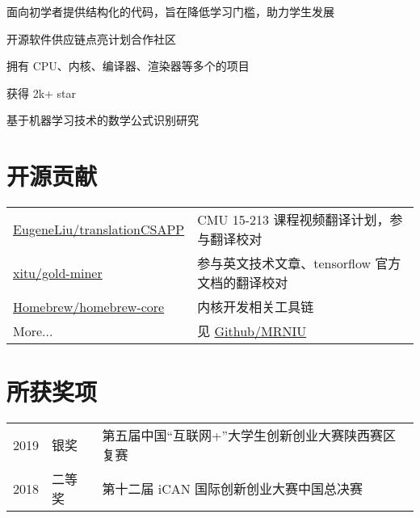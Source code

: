 \documentclass[]{deedy-resume-openfont}
\begin{document}
\begin{minipage}[t]{0.73\textwidth}
\begin{tightemize}
    \item 面向初学者提供结构化的代码，旨在降低学习门槛，助力学生发展
    \item 开源软件供应链点亮计划合作社区
    \item 拥有 CPU、内核、编译器、渲染器等多个的项目
    \item 获得 2k+ star
    \end{tightemize}
\sectionsep

\begin{tightemize}
    \item 基于机器学习技术的数学公式识别研究
    \end{tightemize}
\sectionsep


\section{开源贡献}
\begin{tabular}{ll}
    \href{https://github.com/EugeneLiu/translationCSAPP}{EugeneLiu/translationCSAPP} & CMU 15-213 课程视频翻译计划，参与翻译校对 \\
    \href{https://github.com/xitu/gold-miner}{xitu/gold-miner} & 参与英文技术文章、tensorflow 官方文档的翻译校对 \\
    \href{https://github.com/Homebrew/homebrew-core}{Homebrew/homebrew-core} & 内核开发相关工具链 \\
    More... & 见 \href{https://github.com/MRNIU}{Github/MRNIU}
\end{tabular}
\sectionsep


\section{所获奖项} 
\begin{tabular}{rll}
    2019         & 银奖    & 第五届中国“互联网+”大学生创新创业大赛陕西赛区复赛 \\
    2018	     & 二等奖  & 第十二届 iCAN 国际创新创业大赛中国总决赛 \\
\end{tabular}
\sectionsep


% 
% 

\end{minipage} 
\end{document}
